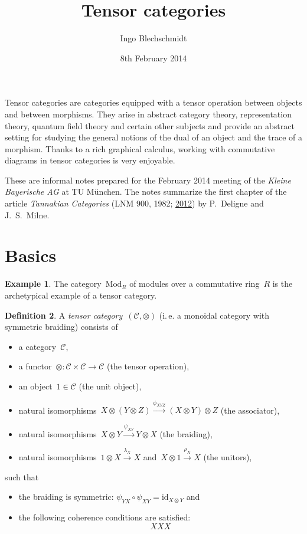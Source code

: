 \documentclass[a4paper,english,12pt]{scrartcl}
\theoremstyle{definition}
\newtheorem{defn}{Definition}[section]
\newtheorem{ex}[defn]{Example}
\theoremstyle{plain}
\theoremstyle{remark}
\newcommand{\C}{\mathcal{C}}
\newcommand{\id}{\mathrm{id}}
\newcommand{\xra}[1]{\xrightarrow{#1}}
\renewcommand{\_}{\mathpunct{.}\,}
\newcommand{\?}{\,{:}\,}
\newcommand{\Mod}{\mathrm{Mod}}
\begin{document}
\title{Tensor categories}
\author{Ingo Blechschmidt}
\date{8th February 2014}
\maketitle

\begin{center}\begin{minipage}{0.8\textwidth}
Tensor categories are categories equipped with a tensor operation between
objects and between morphisms. They arise in abstract category theory,
representation theory, quantum field theory and certain other subjects and
provide an abstract setting for studying the general notions of the dual of
an object and the trace of a morphism. Thanks to a rich graphical calculus,
working with commutative diagrams in tensor categories is very
enjoyable.\medskip

These are informal notes prepared for the February 2014 meeting of the \emph{Kleine
Bayerische AG} at TU München. The notes summarize the first chapter of the
article \emph{Tannakian Categories} (LNM 900, 1982;
\href{http://www.jmilne.org/math/xnotes/tc.pdf}{2012}) by P.~Deligne and
J.~S.~Milne.
\end{minipage}\end{center}

\tableofcontents


\section{Basics}

\begin{ex}The category~$\Mod_R$ of modules over a commutative ring~$R$ is the
archetypical example of a tensor category.\end{ex}

\begin{defn}A \emph{tensor category}~$(\C,\otimes)$ (i.\,e. a monoidal category with
symmetric braiding) consists of
\begin{itemize}
\item a category~$\C$,
\item a functor~${\otimes} : \C \times \C \to \C$ (the tensor operation),
\item an object~$1 \in \C$ (the unit object),
\item natural isomorphisms~$X \otimes (Y \otimes Z) \xra{\phi_{XYZ}} (X \otimes
Y) \otimes Z$ (the associator),
\item natural isomorphisms~$X \otimes Y \xra{\psi_{XY}} Y \otimes X$ (the
braiding),
\item natural isomorphisms~$1 \otimes X \xra{\lambda_X} X$ and~$X \otimes 1
\xra{\rho_X} X$ (the unitors),
\end{itemize}
such that
\begin{itemize}
\item the braiding is symmetric: $\psi_{YX} \circ \psi_{XY} = \id_{X \otimes
Y}$ and
\item the following coherence conditions are satisfied:
\[ XXX \]
\end{itemize}
\end{defn}
\end{document}

